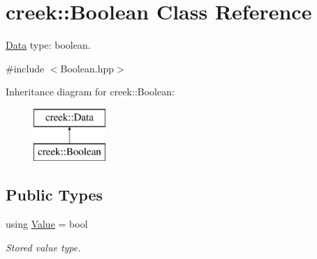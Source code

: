 \hypertarget{classcreek_1_1_boolean}{}\section{creek\+:\+:Boolean Class Reference}
\label{classcreek_1_1_boolean}


\hyperlink{classcreek_1_1_data}{Data} type\+: boolean.  




{\ttfamily \#include $<$Boolean.\+hpp$>$}

Inheritance diagram for creek\+:\+:Boolean\+:\begin{figure}[H]
\begin{center}
\leavevmode
\includegraphics[height=2.000000cm]{classcreek_1_1_boolean}
\end{center}
\end{figure}
\subsection*{Public Types}
\begin{DoxyCompactItemize}
\item 
using \hyperlink{classcreek_1_1_boolean_a7955c007f37b8a29318e49dc8b5bcb13}{Value} = bool\hypertarget{classcreek_1_1_boolean_a7955c007f37b8a29318e49dc8b5bcb13}{}\label{classcreek_1_1_boolean_a7955c007f37b8a29318e49dc8b5bcb13}

\begin{DoxyCompactList}\small\item\em Stored value type. \end{DoxyCompactList}\end{DoxyCompactItemize}
